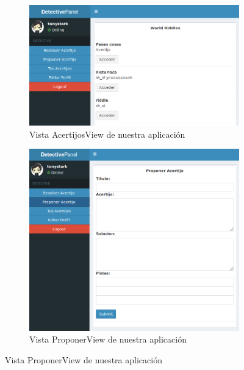 \begin{figure}[hbtp] \centering
\begin{subfigure}{.6\textwidth}
    \includegraphics[width=\linewidth]{figuras/riddling.png}
    \caption{Vista AcertijosView de nuestra aplicación}
    \label{fig::acertijosview}
\end{subfigure}
\begin{subfigure}{.6\textwidth}
    \includegraphics[width=\linewidth]{figuras/proponerview.png}
    \caption{Vista ProponerView de nuestra aplicación}
    \label{fig::proponerview}
\end{subfigure}


\end{figure}
